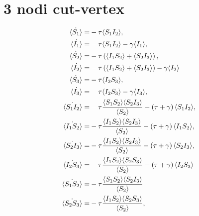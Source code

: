 \documentclass{report}
\begin{document}
\section{3 nodi cut-vertex}
\begin{equation*}
\begin{aligned}
\dot{\angol {S_1}} = & -\tau \angol{ S_1 I_2}, \\
	\dot{\angol {I_1}} = & \spa \tau \angol{S_1 I_2}-\gamma \angol{I_1}, \\
	\dot{\angol {S_2}} = & -\tau \tonde{ \angol{ I_1 S_2} + \angol{S_2I_3}},	\\
	\dot{\angol {I_2}} = &\spa \tau \tonde{ \angol{ I_1 S_2} + \angol{S_2I_3}}-\gamma \angol{I_2}\\
	\dot{\angol {S_3}} = & -\tau \angol{ I_2 S_3},\\	\dot{\angol {I_3}} = & \spa \tau \angol{ I_2 S_3}-\gamma \angol{I_3},\\
 	\dot{\angol{S_1I_2}}=&\spa\tau\frac{\angol{S_1S_2}\angol{S_2I_3}}{\angol{S_2}} - \tonde{ \tau + \gamma}\angol{S_1 I_2},
\\
	\dot{\angol{I_1S_2}}=&-\tau\frac{\angol{I_1S_2}\angol{S_2I_3}}{\angol{S_2}} - \tonde{ \tau + \gamma}\angol{I_1 S_2},
\\
	\dot{\angol{S_2I_3}}=&-\tau\frac{\angol{I_1S_2}\angol{S_2I_3}}{\angol{S_2}} - \tonde{ \tau + \gamma}\angol{S_2 I_3},
\\
	\dot{\angol{I_2S_3}}=&\spa\tau\frac{\angol{I_1S_2}\angol{S_2S_3}}{\angol{S_2}} - \tonde{ \tau + \gamma}\angol{I_2 S_3}\\
	\dot{\angol{S_1S_2}} = &- \tau\frac{\angol{S_1S_2}\angol{S_2I_3}}{\angol{S_2}}\\
	\dot{\angol{S_2S_3}}= & -\tau \frac{\angol{ I_1 S_2}\angol{S_2S_3}}{\angol{S_2}}, 
\end{aligned}
\end{equation*}
\end{document}
